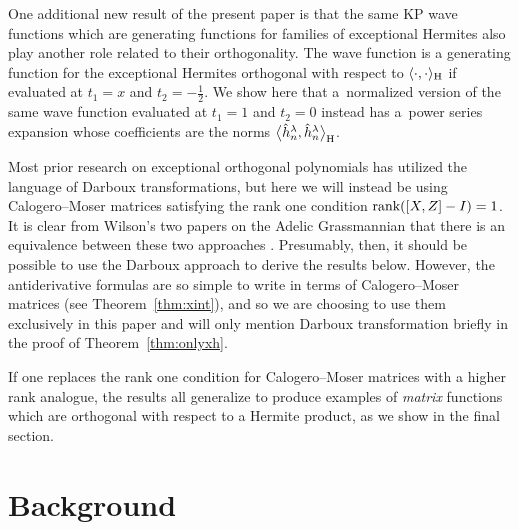 \documentclass[10pt,a4paper]{amsart}
\numberwithin{equation}{section}
\theoremstyle{definition}
\begin{document}
One additional new result of the present paper is that the same KP wave
functions which are generating functions for families of exceptional
Hermites also play another role related to their orthogonality.
The wave function is a generating function for the exceptional
Hermites orthogonal with respect to $\langle\cdot,\cdot\rangle_{\rm H}$ if
evaluated at $t_1=x$ and $t_2=-\tfrac{1}{2}$.
We show here that a~normalized version of the same wave function
 evaluated at $t_1=1$ and $t_2=0$ instead
 has a~power series expansion whose coefficients are the norms $\big\langle \hat
 h_n^\lambda,\hat h_n^\lambda\big\rangle_{\rm H}$.

Most prior research on exceptional orthogonal polynomials has utilized the language of
Darboux transformations, but here we will instead be using Calogero--Moser matrices
satisfying the rank one condition $\hbox{rank}([X,Z]-I)=1$.
It is clear from Wilson’s two papers on the Adelic Grassmannian that there is
an equivalence between these two approaches \cite{WilsonBisp,WilsonCM}. Presumably, then, it should be possible to
use the Darboux approach to derive the results below. However, the antiderivative formulas are so
simple to write in terms of Calogero--Moser matrices (see Theorem~\ref{thm:xint}), and so we are choosing to use
them exclusively in this paper and will only mention Darboux transformation briefly in the proof of Theorem~\ref{thm:onlyxh}.

If one replaces the rank one
 condition for Calogero--Moser matrices with a higher rank analogue, the results all generalize
to produce examples of \textit{matrix} functions which are
 orthogonal with respect to a Hermite product, as we show in the final section.

\section{Background}
\end{document}
